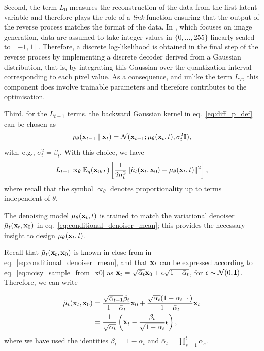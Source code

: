 Second, the term $L_0$ measures the reconstruction of the data from the first latent variable and therefore plays the role of a \emph{link} function ensuring that the output of the reverse process matches the format of the data. In \cite{ho2020ddpm}, which focuses on image generation, data are assumed to take integer values in $\{0,\ldots,255\}$ linearly scaled to $[-1,1]$. Therefore, a discrete log-likelihood is obtained in the final step of the reverse process by implementing a discrete decoder derived from a Gaussian distribution, that is, by integrating this Gaussian over the quantization
interval corresponding to each pixel value. As a consequence, and unlike the term $L_T$, this component does involve trainable parameters and therefore contributes to the optimisation.

Third, for the $L_{t-1}$ terms, the backward Gaussian kernel in eq.~\eqref{eq:diff_p_def} can be chosen as 
\[
p_\theta({ \mathbf{x}}_{t-1} \mid { \mathbf{x}}_t) = {\mathcal N}({ \mathbf{x}}_{t-1} ; \mu_\theta({ \mathbf{x}}_t,t), \sigma_t^2{\mathbf I}),
\]
with, e.g., $\sigma_t^2 = \beta_t$. With this choice, we have 
\begin{equation}
    L_{t-1} \propto_\theta \mathbb{E}_q({ \mathbf{x}}_{0:T})\left[ \frac{1}{2\sigma_t^2 }\| \tilde\mu_t({ \mathbf{x}}_t,{ \mathbf{x}}_0) - \mu_\theta({ \mathbf{x}}_t,t) \|^2\right],
    \label{eq:L_t-1_with_mus}
\end{equation}
where recall that the symbol $\propto_\theta$ denotes proportionality up to terms independent of $\theta$.

\begin{remark}
  The denoising model $\mu_\theta({ \mathbf{x}}_t,t)$ is trained to match the variational denoiser $\tilde\mu_t({ \mathbf{x}}_t,{ \mathbf{x}}_0)$ in eq.~\eqref{eq:conditional_denoiser_mean}; this provides the necessary insight to design  $\mu_\theta({ \mathbf{x}}_t,t)$.   
\end{remark}
Recall that  $\tilde\mu_t({ \mathbf{x}}_t,{ \mathbf{x}}_0)$ is known in close from in eq.~\eqref{eq:conditional_denoiser_mean}, and that ${ \mathbf{x}}_t$ can be expressed according to eq.~\eqref{eq:noisy_sample_from_x0} as ${ \mathbf{x}}_t = \sqrt{\bar\alpha_t}{ \mathbf{x}}_0 + \epsilon\sqrt{1-\bar\alpha_t}$, for $\epsilon\sim{\mathcal N}(0,{\mathbf I})$. Therefore, we can write 

\begin{align}
    \tilde{\mu}_t({ \mathbf{x}}_t,{ \mathbf{x}}_0)
    &=
    \frac{\sqrt{\bar{\alpha}_{t-1}}\beta_t}{1-\bar{\alpha}_t}{ \mathbf{x}}_0
    +
    \frac{\sqrt{\alpha_t}(1-\bar{\alpha}_{t-1})}{1-\bar{\alpha}_t}{ \mathbf{x}}_t\nonumber\\
    &= \frac1{\sqrt{\alpha_t}}\left({ \mathbf{x}}_t - \frac{\beta_t}{\sqrt{1-\bar\alpha_t}}\epsilon\right),  \label{eq:new_mu_tilde}
\end{align}
where we have used the identities $\beta_t = 1-\alpha_t$ and $\bar\alpha_t = \prod_{s=1}^{t}\alpha_s$.



